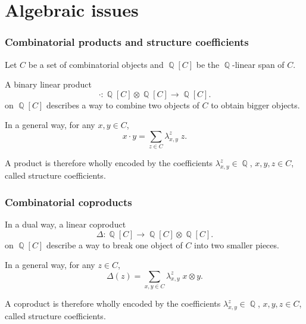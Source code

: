\documentclass[unknownkeysallowed,10pt,xcolor={dvipsnames}]{beamer}
\DeclareMathOperator{\QQ}{\mathbb{Q}}
\begin{document}


\section{Algebraic issues}

\begin{frame} \frametitle{Combinatorial products and structure coefficients}
Let $C$ be a set of combinatorial objects and $\QQ[C]$ be the
$\QQ$-linear span of $C$.
\medskip

A binary linear product
\begin{equation*}
    \cdot : \QQ[C] \otimes \QQ[C] \to \QQ[C].
\end{equation*}
on $\QQ[C]$ describes a way to \alert{combine} two objects of
$C$ to obtain \alert{bigger} objects.
\medskip

In a general way, for any $x, y \in C$,
\begin{equation*}
    x \cdot y = \sum_{z \in C} \lambda_{x, y}^z \; z.
\end{equation*}
\medskip

A product is therefore wholly encoded by the coefficients
$\lambda_{x, y}^z \in \QQ$, $x, y, z \in C$, called
\alert{structure coefficients}.
\end{frame}

\begin{frame} \frametitle{Combinatorial coproducts}
In a dual way, a linear coproduct
\begin{equation*}
    \Delta : \QQ[C] \to \QQ[C] \otimes \QQ[C].
\end{equation*}
on $\QQ[C]$ describe a way to \alert{break} one object of $C$ into
\alert{two smaller} pieces.
\medskip

In a general way, for any $z \in C$,
\begin{equation*}
    \Delta(z) = \sum_{x, y \in C}  \lambda_{x, y}^z \;  x \otimes y.
\end{equation*}
\medskip

A coproduct is therefore wholly encoded by the coefficients
$\lambda_{x, y}^z \in \QQ$, $x, y, z \in C$, called
\alert{structure coefficients}.
\end{frame}
\end{document}

